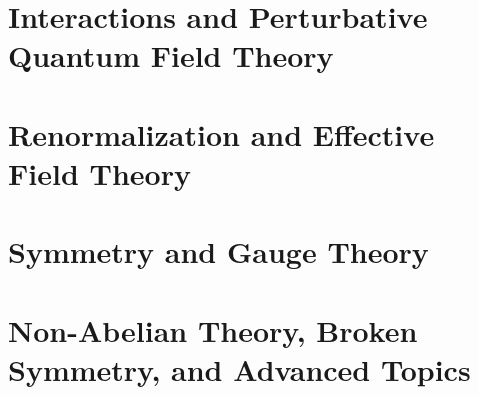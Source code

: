 \documentclass[11pt,oneside]{book}
\begin{document}
\part{Interactions and Perturbative Quantum Field Theory}








\part{Renormalization and Effective Field Theory}








\part{Symmetry and Gauge Theory}








\part{Non-Abelian Theory, Broken Symmetry, and Advanced Topics}









\appendix




\backmatter

\nocite{noether1918,peskin1995,weinberg1995,zee2010,srednicki2007,schwartz2014,ryder1996}

\end{document}

